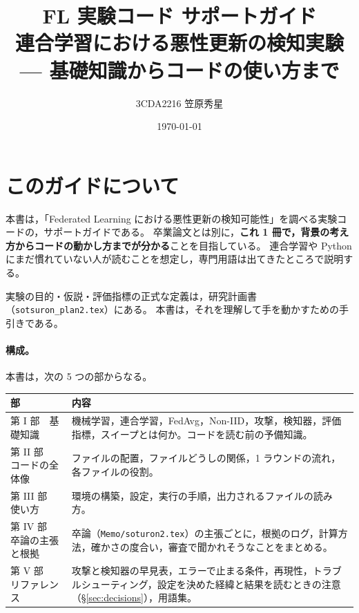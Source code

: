 \documentclass[a4j, dvipdfmx]{jsarticle}  %
\title{FL 実験コード サポートガイド\\
\large 連合学習における悪性更新の検知実験 --- 基礎知識からコードの使い方まで}
\author{3CDA2216 笠原秀星}
\date{\today}
\begin{document}
\maketitle
\tableofcontents
\clearpage

\section{このガイドについて}

本書は，「Federated Learning における悪性更新の検知可能性」を調べる実験コードの，サポートガイドである。
卒業論文とは別に，\textbf{これ 1 冊で，背景の考え方からコードの動かし方までが分かる}ことを目指している。
連合学習や Python にまだ慣れていない人が読むことを想定し，専門用語は出てきたところで説明する。

実験の目的・仮説・評価指標の正式な定義は，研究計画書（\texttt{sotsuron\_plan2.tex}）にある。
本書は，それを理解して手を動かすための手引きである。

\paragraph{構成。}
本書は，次の 5 つの部からなる。
\begin{table}[H]
\centering
\begin{tabular}{@{}P{4.6cm} P{10.7cm}@{}}
\toprule
部 & 内容 \\
\midrule
第 I 部　基礎知識 & 機械学習，連合学習，FedAvg，Non-IID，攻撃，検知器，評価指標，スイープとは何か。コードを読む前の予備知識。 \\
第 II 部　コードの全体像 & ファイルの配置，ファイルどうしの関係，1 ラウンドの流れ，各ファイルの役割。 \\
第 III 部　使い方 & 環境の構築，設定，実行の手順，出力されるファイルの読み方。 \\
第 IV 部　卒論の主張と根拠 & 卒論（\texttt{Memo/soturon2.tex}）の主張ごとに，根拠のログ，計算方法，確かさの度合い，審査で聞かれそうなことをまとめる。 \\
第 V 部　リファレンス & 攻撃と検知器の早見表，エラーで止まる条件，再現性，トラブルシューティング，設定を決めた経緯と結果を読むときの注意（\S\ref{sec:decisions}），用語集。 \\
\bottomrule
\end{tabular}
\end{table}
\end{document}
